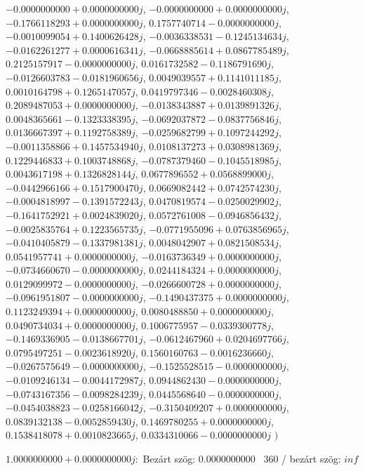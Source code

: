 \documentclass[14pt,a4paper]{article}
\begin{document}
\begin{itemize}
$-0.0000000000+0.0000000000j$, $-0.0000000000+0.0000000000j$, $-0.1766118293+0.0000000000j$, $0.1757740714-0.0000000000j$, $-0.0010099054+0.1400626428j$, $-0.0036338531-0.1245134634j$, $-0.0162261277+0.0000616341j$, $-0.0668885614+0.0867785489j$, $0.2125157917-0.0000000000j$, $0.0161732582-0.1186791690j$, $-0.0126603783-0.0181960656j$, $0.0049039557+0.1141011185j$, $0.0010164798+0.1265147057j$, $0.0419797346-0.0028460308j$, $0.2089487053+0.0000000000j$, $-0.0138343887+0.0139891326j$, $0.0048365661-0.1323338395j$, $-0.0692037872-0.0837756846j$, $0.0136667397+0.1192758389j$, $-0.0259682799+0.1097244292j$, $-0.0011358866+0.1457534940j$, $0.0108137273+0.0308981369j$, $0.1229446833+0.1003748868j$, $-0.0787379460-0.1045518985j$, $0.0043617198+0.1326828144j$, $0.0677896552+0.0568899000j$, $-0.0442966166+0.1517900470j$, $0.0669082442+0.0742574230j$, $-0.0004818997-0.1391572243j$, $0.0470819574-0.0250029902j$, $-0.1641752921+0.0024839020j$, $0.0572761008-0.0946856432j$, $-0.0025835764+0.1223565735j$, $-0.0771955096+0.0763856965j$, $-0.0410405879-0.1337981381j$, $0.0048042907+0.0821508534j$, $0.0541957741+0.0000000000j$, $-0.0163736349+0.0000000000j$, $-0.0734660670-0.0000000000j$, $0.0244184324+0.0000000000j$, $0.0129099972-0.0000000000j$, $-0.0266600728+0.0000000000j$, $-0.0961951807-0.0000000000j$, $-0.1490437375+0.0000000000j$, $0.1123249394+0.0000000000j$, $0.0080488850+0.0000000000j$, $0.0490734034+0.0000000000j$, $0.1006775957-0.0339300778j$, $-0.1469336905-0.0138667701j$, $-0.0612467960+0.0204697766j$, $0.0795497251-0.0023618920j$, $0.1560160763-0.0016236660j$, $-0.0267575649-0.0000000000j$, $-0.1525528515-0.0000000000j$, $-0.0109246134-0.0044172987j$, $0.0944862430-0.0000000000j$, $-0.0743167356-0.0098284239j$, $0.0445568640-0.0000000000j$, $-0.0454038823-0.0258166042j$, $-0.3150409207+0.0000000000j$, $0.0839132138-0.0052859430j$, $0.1469780255+0.0000000000j$, $0.1538418078+0.0010823665j$, $0.0334310066-0.0000000000j$
$\big)$
\end{itemize}
$1.0000000000+0.0000000000j$:\
Bezárt szög: $0.0000000000$ \
360 / bezárt szög: $inf$\
\end{document}

